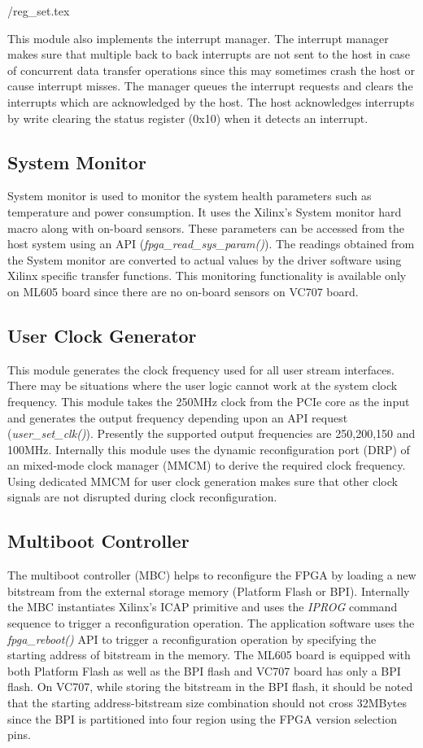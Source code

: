  \TBLDIR/reg_set.tex

This module also implements the interrupt manager.
The interrupt manager makes sure that multiple back to back interrupts are not sent to the host in case of concurrent data transfer operations since this may sometimes crash the host or cause interrupt misses.
The manager queues the interrupt requests and clears the interrupts which are acknowledged by the host.
The host acknowledges interrupts by write clearing the status register (0x10) when it detects an interrupt.
\subsection{System Monitor}
System monitor is used to monitor the system health parameters such as temperature and power consumption.
It uses the Xilinx's System monitor hard macro along with on-board sensors.
These parameters can be accessed from the host system using an API (\emph{fpga\_read\_sys\_param()}).
The readings obtained from the System monitor are converted to actual values by the driver software using Xilinx specific transfer functions.
This monitoring functionality is available only on ML605 board since there are no on-board sensors on VC707 board.

\subsection{User Clock Generator}
This module generates the clock frequency used for all user stream interfaces.
There may be situations where the user logic cannot work at the system clock frequency.
This module takes the 250MHz clock from the PCIe core as the input and generates the output frequency depending upon an API request (\emph{user\_set\_clk()}).
Presently the supported output frequencies are 250,200,150 and 100MHz.
Internally this module uses the dynamic reconfiguration port (DRP) of an mixed-mode clock manager (MMCM) to derive the required clock frequency.
Using dedicated MMCM for user clock generation makes sure that other clock signals are not disrupted during clock reconfiguration.

\subsection{Multiboot Controller}
The multiboot controller (MBC) helps to reconfigure the FPGA by loading a new bitstream from the external storage memory (Platform Flash or BPI).
Internally the MBC instantiates Xilinx's ICAP primitive and uses the \emph{IPROG} command sequence to trigger a reconfiguration operation.
The application software uses the \emph{fpga\_reboot()} API to trigger a reconfiguration operation by specifying the starting address of bitstream in the memory.
The ML605 board is equipped with both Platform Flash as well as the BPI flash and VC707 board has only a BPI flash.
On VC707, while storing the bitstream in the BPI flash, it should be noted that the starting address-bitstream size combination should not cross 32MBytes since the BPI is partitioned into four region using the FPGA version selection pins.

